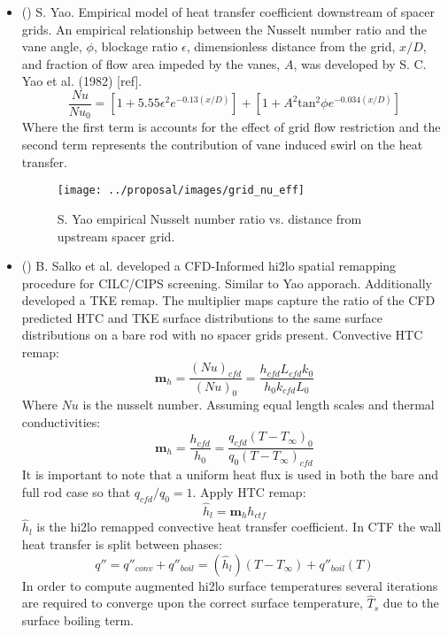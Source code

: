 \begin{itemize}
    
    \item (\checkmark) S. Yao.  Empirical model of heat transfer coefficient downstream of spacer grids. \cite{yao82}
    An empirical relationship between the Nusselt number ratio and the vane angle, $\phi$, blockage ratio $\epsilon$, dimensionless distance from the grid, $x/D$, and fraction of flow area impeded by the vanes, $A$, was developed by S. C. Yao et al. (1982) [ref].
\begin{equation}
\frac{Nu}{Nu_0}  = \left[ 1 + 5.55 \epsilon^2 e^{-0.13(x/D)}\right] + \left[ 1 + A^2\mathrm{tan}^2\phi e^{-0.034(x/D)} \right]
\end{equation}
Where the first term is accounts for the effect of grid flow restriction and the second term represents the contribution of vane induced swirl on the heat transfer.

\begin{figure}[H]
    \centering
    \texttt{[image: ../proposal/images/grid\_nu\_eff]}
    \caption{S. Yao empirical Nusselt number ratio vs. distance from upstream spacer grid.}
    \label{fig:gridnueff}
\end{figure}

    \item (\checkmark) B. Salko et al. developed a CFD-Informed hi2lo spatial remapping procedure for CILC/CIPS screening. \cite{salko17}
    Similar to Yao apporach.  Additionally developed a TKE remap.
    The multiplier maps capture the ratio of the CFD predicted HTC and TKE surface distributions to the same surface distributions on a bare rod with no spacer grids present.
    Convective HTC remap:
    \begin{equation}
        \mathbf m_h = \frac{(Nu)_{cfd}}{(Nu)_{0}} = \frac{h_{cfd} L_{cfd} k_{0} }{h_{0}k_{cfd} L_{0}}
    \end{equation}
    Where $Nu$ is the nusselt number.  Assuming equal length scales and thermal conductivities:
    \begin{equation}
        \mathbf m_h = \frac{h_{cfd}}{h_{0}} = \frac{q_{cfd}(T-T_\infty)_{0}}{q_{0}(T-T_\infty)_{cfd}}
    \end{equation}
    It is important to note that a uniform heat flux is used in both the bare and full rod case so that $q_{cfd}/q_0 =1 $.
    Apply HTC remap:
    \begin{equation}
        \hat h_{l} = \mathbf m_h h_{ctf}
    \end{equation}
    $\hat h_l$ is the hi2lo remapped convective heat transfer coefficient.  In CTF the wall heat transfer is split between phases:
    \begin{equation}
        q'' = q''_{conv} + q''_{boil} = (\hat h_l)(T-T_{\infty}) + q''_{boil}(T)
    \end{equation}
    In order to compute augmented hi2lo surface temperatures
    several iterations are required to converge upon the correct surface temperature, $\hat T_s$ due to the surface boiling term.


\end{itemize}
